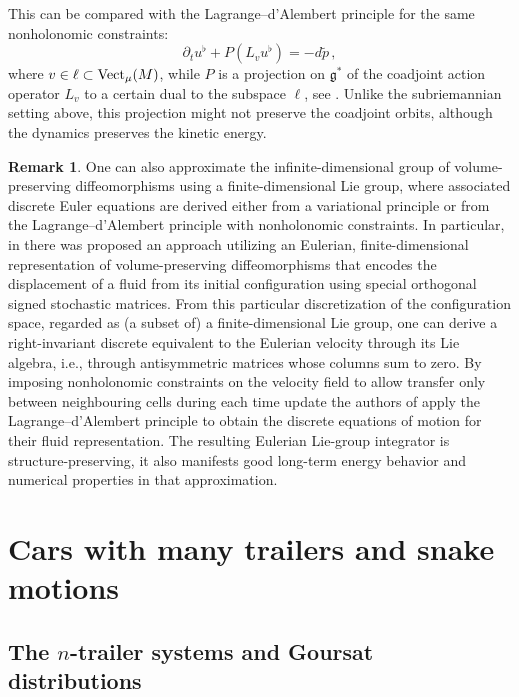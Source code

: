 \documentclass[11pt]{article}
\theoremstyle{definition}
\newtheorem{remark}[lemma]{Remark}
\newcounter{ai}
\begin{document}
This can be compared with the Lagrange--d'Alembert principle for the same nonholonomic constraints:
$$
\partial_t u^\flat +P(L_v u^\flat) =-d\tilde p\,,
$$
where  $v\in \ell\subset {\rm Vect}_\mu(M)$, while $P$ is a projection on $\mathfrak g^*$ of the coadjoint action operator $L_v$ 
to a certain dual to the subspace $\ell$, see \cite{Sina}.  Unlike the subriemannian setting above, this projection might not preserve the coadjoint orbits, although the dynamics preserves the kinetic energy.


\begin{remark}
One can also approximate the infinite-dimensional group of volume-preserving diffeomorphisms using 
a finite-dimensional Lie group, where associated discrete Euler equations are derived either from 
a variational principle or from the Lagrange--d'Alembert principle with nonholonomic constraints. 
In particular, in \cite{marsden2009structure} there was proposed an approach utilizing an Eulerian, 
finite-dimensional representation of volume-preserving diffeomorphisms that encodes the displacement of a fluid from its initial configuration using special orthogonal signed stochastic matrices. From this particular discretization of the configuration space,  regarded as (a subset of) a finite-dimensional Lie group, one can derive a right-invariant discrete equivalent to the Eulerian velocity through its Lie algebra, i.e., through antisymmetric matrices whose columns sum to zero. 
By  imposing  nonholonomic constraints on the velocity field to allow transfer only between neighbouring cells during each time update the authors of \cite{marsden2009structure} apply the Lagrange--d'Alembert principle to obtain the discrete equations of motion for their fluid representation. The resulting Eulerian Lie-group integrator is structure-preserving, it also manifests good long-term energy behavior and  numerical properties in that approximation.
\end{remark}




\section{Cars with many trailers and snake motions}

\subsection{The \texorpdfstring{$n$}{n}-trailer systems and Goursat distributions}
\label{sec:ntrailers}
\end{document}
